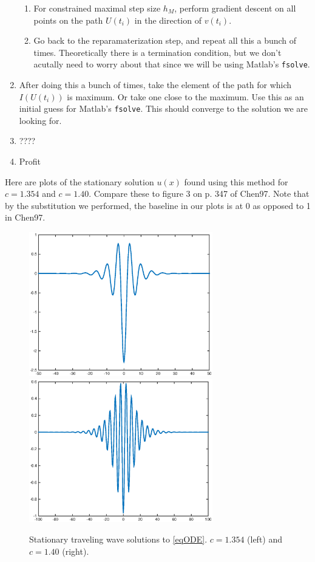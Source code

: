 \documentclass[12pt]{article}
\begin{document}
\begin{enumerate}
\begin{enumerate}
		\item For constrained maximal step size $h_M$, perform gradient descent on all points on the path $U(t_i)$ in the direction of $v(t_i)$.
		\item Go back to the reparamaterization step, and repeat all this a bunch of times. Theoretically there is a termination condition, but we don't acutally need to worry about that since we will be using Matlab's \texttt{fsolve}.
	\end{enumerate}
	\item After doing this a bunch of times, take the element of the path for which $I(U(t_i))$ is maximum. Or take one close to the maximum. Use this as an initial guess for Matlab's \texttt{fsolve}. This should converge to the solution we are looking for.
	\item ????
	\item Profit
\end{enumerate}

Here are plots of the stationary solution $u(x)$ found using this method for $c = 1.354$ and $c = 1.40$. Compare these to figure 3 on p. 347 of Chen97. Note that by the substitution we performed, the baseline in our plots is at 0 as opposed to 1 in Chen97.

\begin{figure}[H]
\centering
\includegraphics[width=8cm]{single1354.eps}
\includegraphics[width=8cm]{single14.eps}
\label{fig:single1}
\caption{Stationary traveling wave solutions to \eqref{eqODE}. $c = 1.354$ (left) and $c = 1.40$ (right).}
\end{figure}
\end{document}
